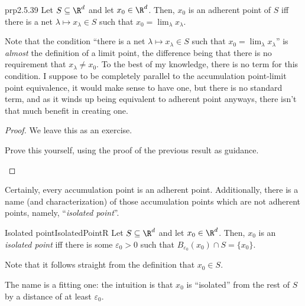 \begin{prp}{}{prp2.5.39}
Let $S\subseteq \R ^d$ and let $x_0\in \R ^d$.  Then, $x_0$ is an adherent point of $S$ iff there is a net $\lambda \mapsto x_{\lambda} \in S$ such that $x_0=\lim _{\lambda}x_{\lambda}$.
\begin{rmk}
Note that the condition ``there is a net $\lambda \mapsto x_{\lambda}\in S$ such that $x_0=\lim _{\lambda}x_{\lambda}$'' is \emph{almost} the definition of a limit point, the difference being that there is no requirement that $x_{\lambda}\neq x_0$.  To the best of my knowledge, there is no term for this condition.  I suppose to be completely parallel to the accumulation point-limit point equivalence, it would make sense to have one, but there is no standard term, and as it winds up being equivalent to adherent point anyways, there isn't that much benefit in creating one.
\end{rmk}
\begin{proof}
We leave this as an exercise.
\begin{exr}{}{}
Prove this yourself, using the proof of the previous result as guidance.
\end{exr}
\end{proof}
\end{prp}
Certainly, every accumulation point is an adherent point.  Additionally, there is a name (and characterization) of those accumulation points which are not adherent points, namely, ``\emph{isolated point}''.
\begin{dfn}{Isolated point}{IsolatedPointR}
Let $S\subseteq \R ^d$ and let $x_0\in \R ^d$.  Then, $x_0$ is an \emph{isolated point} iff there is some $\varepsilon _0>0$ such that $B_{\varepsilon _0}(x_0)\cap S=\{ x_0\}$.
\begin{rmk}
Note that it follows straight from the definition that $x_0\in S$.
\end{rmk}
\begin{rmk}
The name is a fitting one:  the intuition is that $x_0$ is ``isolated'' from the rest of $S$ by a distance of at least $\varepsilon _0$.
\end{rmk}
\end{dfn}
